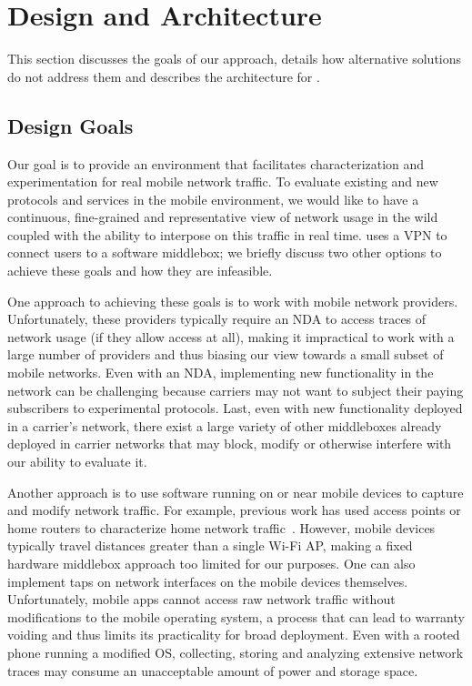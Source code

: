 \vspace{-0.1em}
\section{Design and Architecture}
 This section discusses the goals of our approach, details how alternative solutions do not address them 
 and describes the architecture for \meddle.
 \subsection{Design Goals}
Our goal is to provide an environment that facilitates characterization and experimentation 
for real mobile network traffic. To evaluate existing and new protocols and services in the 
mobile environment, we would like to have a continuous, fine-grained and representative 
view of network usage in the wild coupled with the ability to interpose on this traffic in real time. 
\meddle uses a VPN to connect users to a software middlebox; we briefly discuss two other 
options to achieve these goals and how they are infeasible.

One approach to achieving these goals is to work with mobile network
providers. Unfortunately, these providers typically require an NDA to
access traces of network usage (if they allow access at all), making
it impractical to work with a large number of providers and thus
biasing our view towards a small subset of mobile networks. Even with
an NDA, implementing new functionality in the network can be
challenging because carriers may not want to subject their paying
subscribers to experimental protocols. 
Last, even with new functionality deployed in a carrier's network, there exist a large variety of other middleboxes already deployed in carrier networks that may block, modify or otherwise interfere with our ability to evaluate it.

Another approach is to use software running on or near mobile devices
to capture and modify network traffic. For example, previous work has
used access points or home routers to characterize home network
traffic~\cite{samknows:ofcom}. However, mobile devices typically
travel distances greater than a single Wi-Fi AP, making a fixed
hardware middlebox approach too limited for our purposes. One can also
implement taps on network interfaces on the mobile devices
themselves. Unfortunately, mobile apps cannot access raw network
traffic without modifications to the mobile operating system, a
process that can lead to warranty voiding and thus limits its
practicality for broad deployment. Even with a rooted phone running a
modified OS, collecting, storing and analyzing extensive network
traces may consume an unacceptable amount of power and storage space.

